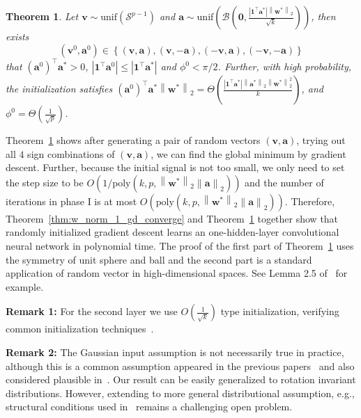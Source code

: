 \documentclass{article}
\newcommand{\poly}{\mathrm{poly}}
\newcommand{\unif}{\mathrm{unif}}
\newcommand{\firstlayer}{w}
\newcommand{\firstlayerWN}{v}
\newcommand{\secondlayer}{a}
\newcommand{\vect}[1]{\mathbf{#1}}
\newcommand{\norm}[1]{\left\|#1\right\|}
\newcommand{\abs}[1]{\left|#1\right|}
\newtheorem{thm}{Theorem}[section]
\begin{document}
\begin{thm}\label{thm:init}
Let $\vect{\firstlayerWN} \sim \unif\left(\mathcal{S}^{p-1}\right)$ and $\vect{\secondlayer} \sim \unif\left( \mathcal{B}\left(\vect{0},\frac{\abs{\vect{1}^\top\vect{\secondlayer}^*}\norm{\vect{\firstlayer}^*}_2}{\sqrt{k}}\right)\right)$, then exists \[\left(\vect{\firstlayerWN}^0,\vect{\secondlayer}^0\right) \in \left\{\left(\vect{\firstlayerWN},\vect{\secondlayer}\right), \left(\vect{\firstlayerWN},-\vect{\secondlayer}\right), \left(-\vect{\firstlayerWN},\vect{\secondlayer}\right), \left(-\vect{\firstlayerWN},-\vect{\secondlayer}\right)  \right\}\] that $\left(\vect{\secondlayer}^0\right)^\top \vect{\secondlayer}^* > 0$, $\abs{ \vect{1}^\top\vect{\secondlayer}^0}\le \abs{\vect{1}^\top \vect{\secondlayer}^*}$ and $\phi^0 <\pi/2$.
Further, with high probability, the initialization satisfies $\left(\vect{\secondlayer}^0\right)^\top \vect{\secondlayer}^*\norm{\vect{\firstlayer}^*}_2 = \Theta\left(\frac{\abs{\vect{1}^\top\vect{\secondlayer}^*}\norm{\vect{\secondlayer}^*}_2\norm{\vect{\firstlayer}^*}_2^2}{k}\right)$, and $\phi^0 = \Theta\left(\frac{1}{\sqrt{p}}\right)$.
\end{thm}
Theorem~\ref{thm:init} shows after generating a pair of random vectors $(\vect{\firstlayerWN},\vect{\secondlayer})$, trying out all $4$ sign combinations of $(\vect{\firstlayerWN},\vect{\secondlayer})$, we can find the global minimum by gradient descent.
Further, because the initial signal is not too small, we only need to set the step size to be $O(1/\poly(k,p,\norm{\vect{\firstlayer}^*}_2\norm{\vect{\secondlayer}}_2))$ and the number of iterations in phase I is at most $O(\poly(k,p,\norm{\vect{\firstlayer}^*}_2\norm{\vect{\secondlayer}}_2))$.
Therefore, Theorem~\ref{thm:w_norm_1_gd_converge} and Theorem~\ref{thm:init} together show that randomly initialized gradient descent learns an one-hidden-layer convolutional neural network in polynomial time.
The proof of the first part of Theorem~\ref{thm:init} uses the symmetry of unit sphere and ball and the second part is a standard application of random vector in high-dimensional spaces.
See Lemma 2.5 of~\citep{hardt2014noisy} for example.

\noindent\textbf{Remark 1:} For the second layer we use $O\left(\frac{1}{\sqrt{k}}\right)$ type initialization, verifying common initialization techniques~\citep{glorot2010understanding,he2015delving,lecun1998efficient}.

\noindent\textbf{Remark 2:} The Gaussian input assumption is not necessarily true in practice, although this is a common assumption appeared in the previous papers~\citep{brutzkus2017globally,li2017convergence,zhong2017learning,zhong2017recovery,tian2017analytical,xie2017diverse,shalev2017weight} and also considered plausible in~\citep{choromanska2015loss}. 
Our result can be easily generalized to rotation invariant distributions.
However, extending to more general distributional assumption, e.g., structural conditions used in~\citep{du2017convolutional} remains a challenging open problem.
\end{document}
